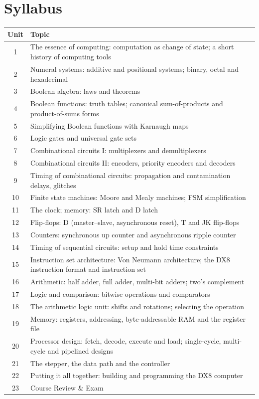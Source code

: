 \documentclass[11pt,a4paper]{article}
\begin{document}
\section{Syllabus}
\begin{tabularx}{\textwidth}{c X}
\toprule
\textbf{Unit} & \textbf{Topic} \\
\midrule
1  & The essence of computing: computation as change of state; a short history of computing tools \\
2  & Numeral systems: additive and positional systems; binary, octal and hexadecimal \\
3  & Boolean algebra: laws and theorems \\
4  & Boolean functions: truth tables; canonical sum-of-products and product-of-sums forms \\
5  & Simplifying Boolean functions with Karnaugh maps \\
6  & Logic gates and universal gate sets \\
7  & Combinational circuits I: multiplexers and demultiplexers \\
8  & Combinational circuits II: encoders, priority encoders and decoders \\
9  & Timing of combinational circuits: propagation and contamination delays, glitches \\
10 & Finite state machines: Moore and Mealy machines; FSM simplification \\
11 & The clock; memory: SR latch and D latch \\
12 & Flip-flops: D (master--slave, asynchronous reset), T and JK flip-flops \\
13 & Counters: synchronous up counter and asynchronous ripple counter \\
14 & Timing of sequential circuits: setup and hold time constraints \\
15 & Instruction set architecture: Von Neumann architecture; the DX8 instruction format and instruction set \\
16 & Arithmetic: half adder, full adder, multi-bit adders; two's complement \\
17 & Logic and comparison: bitwise operations and comparators \\
18 & The arithmetic logic unit: shifts and rotations; selecting the operation \\
19 & Memory: registers, addressing, byte-addressable RAM and the register file \\
20 & Processor design: fetch, decode, execute and load; single-cycle, multi-cycle and pipelined designs \\
21 & The stepper, the data path and the controller \\
22 & Putting it all together: building and programming the DX8 computer \\
23 & Course Review \& Exam \\
\bottomrule
\end{tabularx}
\end{document}

